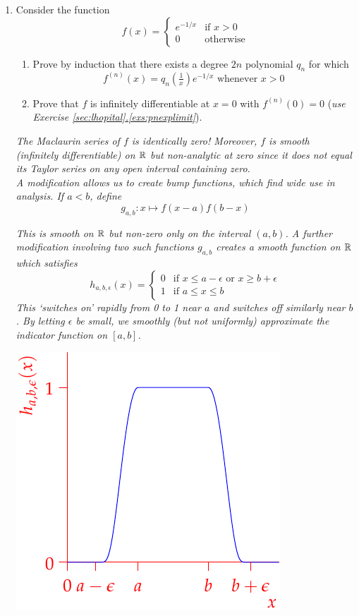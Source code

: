 \begin{exercises}
\begin{enumerate}
 	\goodbreak
 	
 	\item\label{exs:macnoteq} Consider the function
	\[f(x)=\begin{cases}
		e^{-1/x}&\text{if }x>0\\
		0&\text{otherwise}
	\end{cases}\]
	\begin{enumerate}
	  \item Prove by induction that there exists a degree $2n$ polynomial $q_n$ for which
		\[f^{(n)}(x)=q_n\left(\tfrac 1x\right)e^{-1/x}\text{ whenever }x>0\]
		\item Prove that $f$ is infinitely differentiable at $x=0$ with $f^{(n)}(0)=0$ (\emph{use Exercise \hyperref[exs:pnexplimit]{\ref*{sec:lhopital}.\ref*{exs:pnexplimit}}}).
	\end{enumerate}
	\emph{The Maclaurin series of $f$ is identically zero! Moreover, $f$ is smooth (infinitely differentiable) on $\mathbb{R}$ but non-analytic at zero since it does not equal its Taylor series on any open interval containing zero.\\
	A modification allows us to create \emph{bump functions,} which find wide use in analysis. If $a<b$, define
	\[g_{a,b}:x\mapsto f(x-a)f(b-x)\]}

\begin{minipage}[t]{0.6\linewidth}\vspace{-5pt}
\emph{This is smooth on $\mathbb{R}$ but non-zero only on the interval $(a,b)$. A further modification involving two such functions $g_{a,b}$ creates a smooth function on $\mathbb{R}$ which satisfies
\[h_{a,b,\epsilon}(x)=\begin{cases}
0&\text{if $x\le a-\epsilon$ or $x\ge b+\epsilon$}\\
1&\text{if $a\le x\le b$}
\end{cases}\]
This `switches on' rapidly from 0 to 1 near $a$ and switches off similarly near $b$. By letting $\epsilon$ be small, we smoothly (but not uniformly) approximate the indicator function on $[a,b]$.}
\end{minipage}\begin{minipage}[t]{0.4\linewidth}\vspace{-5pt}
\flushright\includegraphics[scale=0.85]{diff-bump}
\end{minipage}
 	

\end{enumerate}
\end{exercises}

